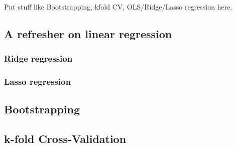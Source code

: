 Put stuff like Bootstrapping, kfold CV, OLS/Ridge/Lasso regression here.

\subsection{A refresher on linear regression}
\subsubsection{Ridge regression}
\subsubsection{Lasso regression}

\subsection{Bootstrapping}
\subsection{k-fold Cross-Validation}
